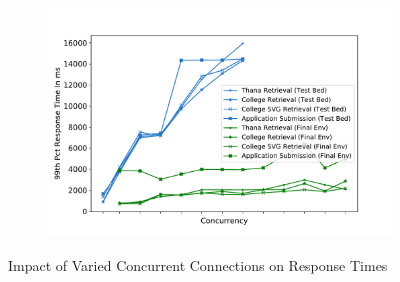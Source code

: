 \documentclass[sigconf,authordraft]{acmart}
\begin{document}
\begin{figure}
\begin{subfigure}{0.49\linewidth}
		\caption{}
		\label{fig:95th_con}
	\end{subfigure}
	\begin{subfigure}{0.49\linewidth}
		\includegraphics[width=\linewidth]{99th_con}
		\caption{}
		\label{fig:99th_con}
	\end{subfigure}
	\caption{Impact of Varied Concurrent Connections on Response Times}
	\label{fig:con_impact}
\end{figure}





\end{document}
